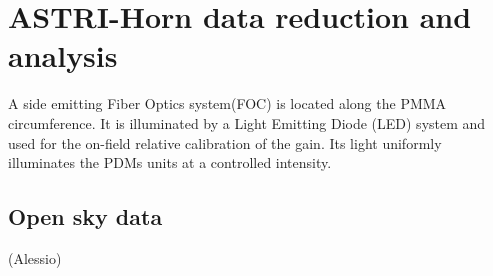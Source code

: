 \section{ASTRI-Horn data reduction and analysis} 
\label{sect:astridata}

A side emitting Fiber Optics system(FOC) is located  along the PMMA 
circumference. It is illuminated by a Light Emitting Diode (LED) 
system and used for the on-field relative calibration of the gain. 
Its light uniformly illuminates the PDMs units at a controlled intensity.

\subsection{Open sky data} (Alessio)
\label{subs:skydata}



